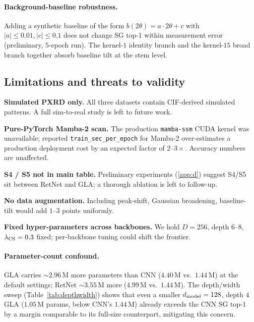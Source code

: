 \documentclass[final]{ws-ijwmip}
\begin{document}
\paragraph{Background-baseline robustness.}
Adding a synthetic baseline of the form $b(2\theta) = a\cdot 2\theta + c$
with $|a|\leq 0.01, |c|\leq 0.1$ does not change SG top-1 within
measurement error (preliminary, $5$-epoch run). The kernel-$1$
identity branch and the kernel-$15$ broad branch together absorb
baseline tilt at the stem level.


\subsection{Limitations and threats to validity}

\begin{romanlist}[(iii)]
\item \textbf{Simulated PXRD only.} All three datasets contain
      CIF-derived simulated patterns. A full sim-to-real study is left
      to future work.
\item \textbf{Pure-PyTorch Mamba-2 scan.} The production
      \texttt{mamba-ssm} CUDA kernel was unavailable; reported
      \texttt{train\_sec\_per\_epoch} for Mamba-2 over-estimates a
      production deployment cost by an expected factor of $2$--$3\times$.
      Accuracy numbers are unaffected.
\item \textbf{S4 / S5 not in main table.} Preliminary experiments
      (\ref{app:d}) suggest S4/S5 sit between RetNet and GLA;
      a thorough ablation is left to follow-up.
\item \textbf{No data augmentation.} Including peak-shift, Gaussian
      broadening, baseline-tilt would add $1$--$3$ points uniformly.
\item \textbf{Fixed hyper-parameters across backbones.} We hold
      $D=256$, depth $6$--$8$, $\lambda_{\rm CS}=0.3$ fixed; per-backbone
      tuning could shift the frontier.
\end{romanlist}

\paragraph{Parameter-count confound.} GLA carries $\sim 2.96$\,M more
parameters than CNN ($4.40$\,M vs.\ $1.44$\,M) at the default
settings; RetNet $\sim 3.55$\,M more ($4.99$\,M vs.\ $1.44$\,M). The
depth/width sweep (Table~\ref{tab:depthwidth}) shows that even a
smaller $d_{\rm model}=128$, depth $4$ GLA ($1.05$\,M params, below
CNN's $1.44$\,M) already exceeds the CNN SG top-1 by a margin
comparable to its full-size counterpart, mitigating this concern.
\end{document}
